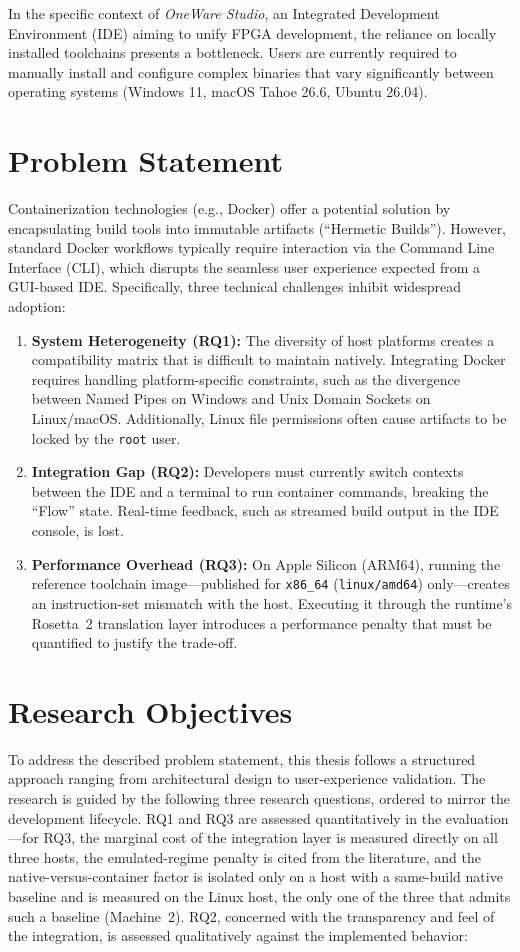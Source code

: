 In the specific context of \textit{OneWare Studio}, an Integrated Development Environment (IDE) aiming to unify FPGA development, the reliance on locally installed toolchains presents a bottleneck. Users are currently required to manually install and configure complex binaries that vary significantly between operating systems (Windows 11, macOS Tahoe 26.6, Ubuntu 26.04).

\section{Problem Statement}
Containerization technologies (e.g., Docker) offer a potential solution by encapsulating build tools into immutable artifacts (``Hermetic Builds''). However, standard Docker workflows typically require interaction via the Command Line Interface (CLI), which disrupts the seamless user experience expected from a GUI-based IDE. Specifically, three technical challenges inhibit widespread adoption:

\begin{enumerate}
    \item \textbf{System Heterogeneity (RQ1):} The diversity of host platforms creates a compatibility matrix that is difficult to maintain natively. Integrating Docker requires handling platform-specific constraints, such as the divergence between Named Pipes on Windows and Unix Domain Sockets on Linux/macOS. Additionally, Linux file permissions often cause artifacts to be locked by the \texttt{root} user.
    \item \textbf{Integration Gap (RQ2):} Developers must currently switch contexts between the IDE and a terminal to run container commands, breaking the ``Flow'' state. Real-time feedback, such as streamed build output in the IDE console, is lost.
    \item \textbf{Performance Overhead (RQ3):} On Apple Silicon (ARM64), running the reference toolchain image---published for \texttt{x86\_64} (\texttt{linux/amd64}) only---creates an instruction-set mismatch with the host. Executing it through the runtime's Rosetta~2 translation layer introduces a performance penalty that must be quantified to justify the trade-off.
\end{enumerate}

\section{Research Objectives}
To address the described problem statement, this thesis follows a structured approach ranging from architectural design to user-experience validation. The research is guided by the following three research questions, ordered to mirror the development lifecycle. RQ1 and RQ3 are assessed quantitatively in the evaluation---for RQ3, the marginal cost of the integration layer is measured directly on all three hosts, the emulated-regime penalty is cited from the literature, and the native-versus-container factor is isolated only on a host with a same-build native baseline and is measured on the Linux host, the only one of the three that admits such a baseline (Machine~2). RQ2, concerned with the transparency and feel of the integration, is assessed qualitatively against the implemented behavior:

